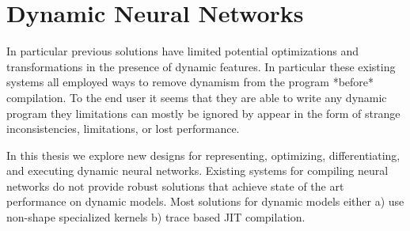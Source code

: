 


\section{Dynamic Neural Networks}

In particular previous solutions have limited potential optimizations
  and transformations in the presence of dynamic features.
In particular these existing systems all employed ways to remove
  dynamism from the program *before* compilation.
To the end user it seems that they are able to write any dynamic
  program they limitations can mostly be ignored by appear in
  the form of strange inconsistencies, limitations, or lost performance.

In this thesis we explore new designs for representing,
  optimizing, differentiating, and executing dynamic neural networks.
Existing systems for compiling neural networks do not provide robust
   solutions that achieve state of the art performance on dynamic models.
Most solutions for dynamic models either
  a) use non-shape specialized kernels b) trace based JIT compilation.

